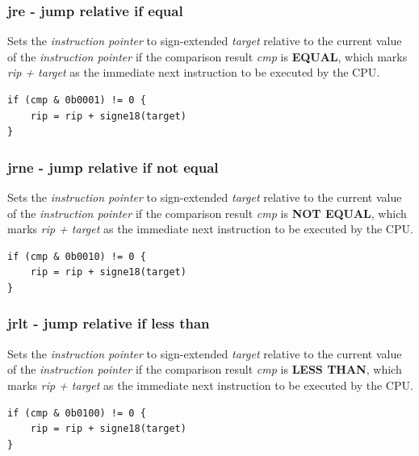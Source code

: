 \documentclass[a4paper,10pt]{article}
\begin{document}
\subsubsection{jre - jump relative if equal}
	{Sets the \emph{instruction pointer} to sign-extended \emph{target} relative to the current value of the \emph{instruction pointer} if the comparison result \emph{cmp} is \textbf{EQUAL}, which marks \emph{rip + target} as the immediate next instruction to be executed by the CPU.}
\begin{lstlisting}
if (cmp & 0b0001) != 0 {
	rip = rip + signe18(target)
}
\end{lstlisting}

\subsubsection{jrne - jump relative if not equal}
	{Sets the \emph{instruction pointer} to sign-extended \emph{target} relative to the current value of the \emph{instruction pointer} if the comparison result \emph{cmp} is \textbf{NOT EQUAL}, which marks \emph{rip + target} as the immediate next instruction to be executed by the CPU.}
\begin{lstlisting}
if (cmp & 0b0010) != 0 {
	rip = rip + signe18(target)
}
\end{lstlisting}

\subsubsection{jrlt - jump relative if less than}
	{Sets the \emph{instruction pointer} to sign-extended \emph{target} relative to the current value of the \emph{instruction pointer} if the comparison result \emph{cmp} is \textbf{LESS THAN}, which marks \emph{rip + target} as the immediate next instruction to be executed by the CPU.}
\begin{lstlisting}
if (cmp & 0b0100) != 0 {
	rip = rip + signe18(target)
}
\end{lstlisting}

\end{document}
